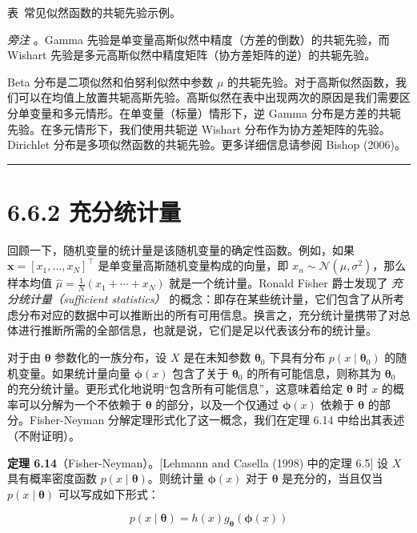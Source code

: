 \label{tab:6-2}表~\thetabcounter\quad 常见似然函数的共轭先验示例。

\emph{旁注} 。Gamma 先验是单变量高斯似然中精度（方差的倒数）的共轭先验，而 Wishart 先验是多元高斯似然中精度矩阵（协方差矩阵的逆）的共轭先验。

Beta 分布是二项似然和伯努利似然中参数 $ \mu $ 的共轭先验。对于高斯似然函数，我们可以在均值上放置共轭高斯先验。高斯似然在表中出现两次的原因是我们需要区分单变量和多元情形。在单变量（标量）情形下，逆 Gamma 分布是方差的共轭先验。在多元情形下，我们使用共轭逆 Wishart 分布作为协方差矩阵的先验。Dirichlet 分布是多项似然函数的共轭先验。更多详细信息请参阅 Bishop (2006)。

\medskip\hrule\medskip

\section*{6.6.2 充分统计量}

回顾一下，随机变量的统计量是该随机变量的确定性函数。例如，如果 $ \boldsymbol{x} = [x_1, \ldots, x_N]^\top $ 是单变量高斯随机变量构成的向量，即 $ x_n \sim \mathcal{N}(\mu, \sigma^2) $，那么样本均值 $ \hat{\mu} = \frac{1}{N}(x_1 + \cdots + x_N) $ 就是一个统计量。Ronald Fisher 爵士发现了 \emph{充分统计量（sufficient statistics）} 的概念：即存在某些统计量，它们包含了从所考虑分布对应的数据中可以推断出的所有可用信息。换言之，充分统计量携带了对总体进行推断所需的全部信息，也就是说，它们是足以代表该分布的统计量。

对于由 $ \boldsymbol{\theta} $ 参数化的一族分布，设 $ X $ 是在未知参数 $ \boldsymbol{\theta}_0 $ 下具有分布 $ p(x \mid \boldsymbol{\theta}_0) $ 的随机变量。如果统计量向量 $ \boldsymbol{\phi}(x) $ 包含了关于 $ \boldsymbol{\theta}_0 $ 的所有可能信息，则称其为 $ \boldsymbol{\theta}_0 $ 的充分统计量。更形式化地说明“包含所有可能信息”，这意味着给定 $ \boldsymbol{\theta} $ 时 $ x $ 的概率可以分解为一个不依赖于 $ \boldsymbol{\theta} $ 的部分，以及一个仅通过 $ \boldsymbol{\phi}(x) $ 依赖于 $ \boldsymbol{\theta} $ 的部分。Fisher-Neyman 分解定理形式化了这一概念，我们在定理 6.14 中给出其表述（不附证明）。

\textbf{定理 6.14}（Fisher-Neyman）。[Lehmann and Casella (1998) 中的定理 6.5] 设 $ X $ 具有概率密度函数 $ p(x \mid \boldsymbol{\theta}) $。则统计量 $ \boldsymbol{\phi}(x) $ 对于 $ \boldsymbol{\theta} $ 是充分的，当且仅当 $ p(x \mid \boldsymbol{\theta}) $ 可以写成如下形式：

\begin{equation}
p(x \mid \boldsymbol{\theta}) = h(x) g_{\boldsymbol{\theta}}(\boldsymbol{\phi}(x))
\tag{6.106}\label{eq:6-106}
\end{equation}

